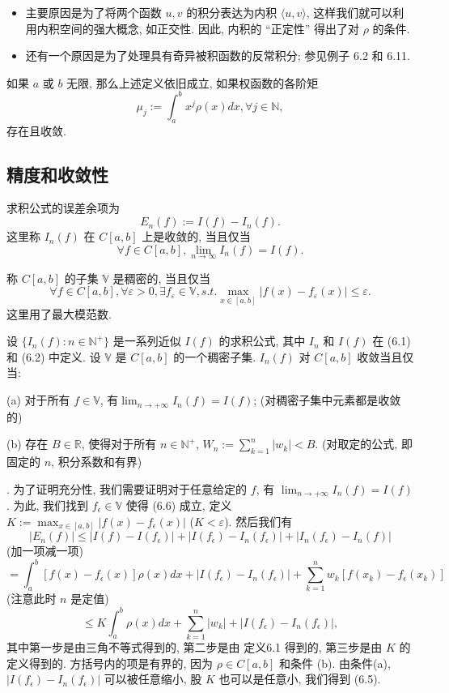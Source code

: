 \documentclass[a4paper]{ctexart}
\newcommand{\hl}[1]
{\noindent {\bf {#1}}}
\begin{document}
{\begin{itemize}
  \item 主要原因是为了将两个函数 $u, v$ 的积分表达为内积 $\langle u, v \rangle$, 
  这样我们就可以利用内积空间的强大概念, 如正交性. 因此, 内积的 ``正定性'' 得出了对 $\rho$ 的条件. 
  \item 还有一个原因是为了处理具有奇异被积函数的反常积分; 参见例子 6.2 和 6.11.
\end{itemize}

\hl{例 6.2} 如果 $a$ 或 $b$ 无限, 那么上述定义依旧成立, 如果权函数的各阶矩
$$
\mu_j := \int_a^b x^j \rho(x) dx, \forall j \in \mathbb{N}, 
$$
存在且收敛. 

\subsection{精度和收敛性}
\hl{定义 6.3} 求积公式的误差余项为
$$
E_n(f) := I(f) - I_n(f).
$$
这里称 $I_n(f)$ 在 $C[a, b]$ 上是收敛的, 当且仅当
$$
\forall f \in C[a, b], \lim_{n \to \infty} I_n(f) = I(f).
$$

\hl{定义 6.4} 称 $C[a, b]$ 的子集 $\mathbb{V}$ 是稠密的, 当且仅当
$$
\forall f \in C[a, b], \forall \varepsilon > 0, 
\exists f_\varepsilon \in \mathbb{V}, s. t. 
\max_{x \in [a, b]}\left|f(x) - f_\varepsilon(x)\right| \leq \varepsilon. 
$$
这里用了最大模范数. 

\hl{定理6.5} 设 $\{I_n(f) : n \in \mathbb{N}^+\}$ 是一系列近似 $I(f)$ 的求积公式, 
其中 $I_n$ 和 $I(f)$ 在 (6.1) 和 (6.2) 中定义. 设 $\mathbb{V}$ 是 $C[a, b]$ 的一个稠密子集. 
$I_n(f)$ 对 $C[a, b]$ 收敛当且仅当: 

(a) 对于所有 $f \in \mathbb{V}$, 有$\lim_{n \to +\infty} I_n(f) = I(f)$; 
(对稠密子集中元素都是收敛的)

(b) 存在 $B \in \mathbb{R}$, 使得对于所有 $n \in \mathbb{N}^+$, $W_n := \sum_{k = 1}^{n} |w_k| < B$. 
(对取定的公式, 即固定的 $n$, 积分系数和有界)

\hl{证明}. 为了证明充分性, 我们需要证明对于任意给定的 $f$, 有 $\lim_{n \to +\infty} I_n(f) = I(f)$. 
为此, 我们找到 $f_{\epsilon} \in \mathbb{V}$ 使得 (6.6) 成立, 定义 
$K := \max_{x \in [a,b]} |f(x) - f_{\epsilon}(x)|$ ($K < \varepsilon$). 然后我们有
\[
|E_n(f)| \leq |I(f) - I(f_{\epsilon})| 
+ |I(f_{\epsilon}) - I_n(f_{\epsilon})| + |I_n(f_{\epsilon}) - I_n(f)|
\]
(加一项减一项)
\[
= \int_{a}^{b} [f(x) - f_{\epsilon}(x)] \rho(x)dx + 
|I(f_{\epsilon}) - I_n(f_{\epsilon})| + \sum_{k = 1}^{n} w_k [f(x_k) - f_{\epsilon}(x_k)]
\]
(注意此时 $n$ 是定值)
\[
\leq K \int_{a}^{b} \rho(x)dx + \sum_{k=1}^{n} |w_k| + |I(f_{\epsilon}) - I_n(f_{\epsilon})|,
\]
其中第一步是由三角不等式得到的, 第二步是由 定义6.1 得到的, 第三步是由 $K$ 的定义得到的. 
方括号内的项是有界的, 因为 $\rho \in C[a, b]$ 和条件 (b). 由条件(a), 
$|I(f_{\epsilon}) - I_n(f_{\epsilon})|$ 可以被任意缩小, 股 $K$ 也可以是任意小, 我们得到 (6.5).

}
\end{document}
